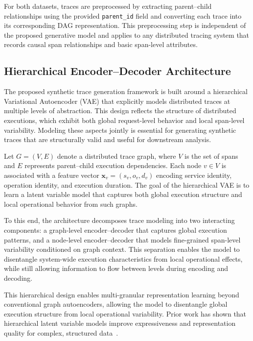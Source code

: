 \documentclass[sigconf,review]{acmart}
\begin{document}
For both datasets, traces are preprocessed by extracting parent--child relationships using the provided \texttt{parent\_id} field and converting each trace into its corresponding DAG representation. This preprocessing step is independent of the proposed generative model and applies to any distributed tracing system that records causal span relationships and basic span-level attributes.


\subsection{Hierarchical Encoder--Decoder Architecture}
\label{sec:architecture}

The proposed synthetic trace generation framework is built around a hierarchical Variational Autoencoder (VAE) that explicitly models distributed traces at multiple levels of abstraction. This design reflects the structure of distributed executions, which exhibit both global request-level behavior and local span-level variability. Modeling these aspects jointly is essential for generating synthetic traces that are structurally valid and useful for downstream analysis.

Let $G = (V, E)$ denote a distributed trace graph, where $V$ is the set of spans and $E$ represents parent--child execution dependencies. Each node $v \in V$ is associated with a feature vector $\mathbf{x}_v = (s_v, o_v, d_v)$ encoding service identity, operation identity, and execution duration. The goal of the hierarchical VAE is to learn a latent variable model that captures both global execution structure and local operational behavior from such graphs.

To this end, the architecture decomposes trace modeling into two interacting components: a graph-level encoder--decoder that captures global execution patterns, and a node-level encoder--decoder that models fine-grained span-level variability conditioned on graph context. This separation enables the model to disentangle system-wide execution characteristics from local operational effects, while still allowing information to flow between levels during encoding and decoding.

This hierarchical design enables multi-granular representation learning beyond conventional graph autoencoders, allowing the model to disentangle global execution structure from local operational variability. Prior work has shown that hierarchical latent variable models improve expressiveness and representation quality for complex, structured data~\cite{ranganath2016hierarchical, maaloe2016auxiliary}.
\end{document}
